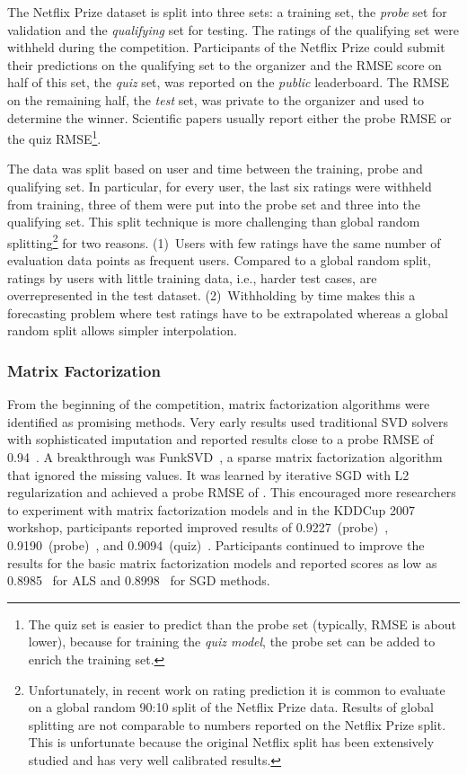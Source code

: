 \documentclass{article}
\newcommand\rmseNFtestpatarek{0.9094}
\newcommand\rmseNFtestZhou{0.8985}
\newcommand\rmseNFprobeGravity{0.9190}
\newcommand\rmseNFtestYehuda{0.8998}
\newcommand\rmseNFprobeKurucz{0.94}
\newcommand\rmseNFprobeLimMAP{0.9227}
\begin{document}
The Netflix Prize dataset is split into three sets: a training set, the \emph{probe} set for validation and the \emph{qualifying} set for testing.
The ratings of the qualifying set were withheld during the competition.
Participants of the Netflix Prize could submit their predictions on the qualifying set to the organizer and the RMSE score on half of this set, the \emph{quiz} set, was reported on the \emph{public} leaderboard.
The RMSE on the remaining half, the \emph{test} set, was private to the organizer and used to determine the winner.
Scientific papers usually report either the probe RMSE or the quiz RMSE\footnote{The quiz set is easier to predict than the probe set (typically, RMSE is about  lower), because for training the \emph{quiz model}, the probe set can be added to enrich the training set.}.

The data was split based on user and time between the training, probe and qualifying set.
In particular, for every user, the last six ratings were withheld from training, three of them were put into the probe set and three into the qualifying set.
This split technique is more challenging than global random splitting\footnote{Unfortunately, in recent work on rating prediction it is common to evaluate on a global random 90:10 split of the Netflix Prize data.
Results of global splitting are not comparable to numbers reported on the Netflix Prize split.
This is unfortunate because the original Netflix split has been extensively studied and has very well calibrated results.} for two reasons.
(1)~Users with few ratings have the same number of evaluation data points as frequent users.
Compared to a global random split, ratings by users with little training data, i.e., harder test cases, are overrepresented in the test dataset.
(2)~Withholding by time makes this a forecasting problem where test ratings have to be extrapolated whereas a global random split allows simpler interpolation.





\subsubsection{Matrix Factorization}


From the beginning of the competition, matrix factorization algorithms were identified as promising methods.
Very early results used traditional SVD solvers with sophisticated imputation and reported results close to a probe RMSE of \rmseNFprobeKurucz~\cite{kurucz:kddcup07}.
A breakthrough was FunkSVD~\cite{funksvd}, a sparse matrix factorization algorithm that ignored the missing values.
It was learned by iterative SGD with L2 regularization and achieved a probe RMSE of .
This encouraged more researchers to experiment with matrix factorization models and in the KDDCup 2007 workshop, participants reported improved results of \rmseNFprobeLimMAP~(probe)~\cite{lim:kddcup07}, \rmseNFprobeGravity~(probe)~\cite{paterek:kddcup07}, and \rmseNFtestpatarek~(quiz)~\cite{paterek:kddcup07}.
Participants continued to improve the results for the basic matrix factorization models and reported scores as low as \rmseNFtestZhou~\cite{zhou:aaim08} for ALS and \rmseNFtestYehuda~\cite{koren:grandprize} for SGD methods.
\end{document}
